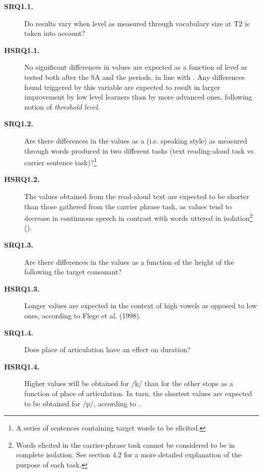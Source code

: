 \documentclass[output=paper]{langsci/langscibook}
\begin{document}
\begin{description}
 \item[\textbf{SRQ1.1.}] Do results vary when  level as measured through vocabulary size at T2 is taken into account? 

\item[\textbf{HSRQ1.1.}] No significant differences in  values are expected as a function of  level as tested both after the SA and the  periods, in line with \citet{AlvesZimmer2015}. Any differences found triggered by this variable are expected to result in larger improvement by low level learners than by more advanced ones, following  notion of \textit{threshold} \textit{level}.

\item[\textbf{SRQ1.2.}] Are there differences in the  values as a  (i.e. speaking style) as measured through words produced in two different tasks (text reading-aloud task vs. carrier sentence task)?\footnote{\textsuperscript{} A series of sentences containing target words to be elicited.}

\item[\textbf{HSRQ1.2.}] The  values obtained from the read-aloud text are expected to be shorter than those gathered from the carrier phrase task, as  values tend to decrease in continuous speech in contrast with words uttered in isolation\footnote{Words elicited in the carrier-phrase task cannot be considered to be in complete isolation. See section 4.2 for a more detailed explanation of the purpose of each task.} (\citealt{Labov1972,Mora2008,Bach2012}).

\item[\textbf{SRQ1.3.}] Are there differences in the  values as a function of the height of the  following the target   consonant?

\item[\textbf{HSRQ1.3.}] Longer  values are expected in the context of high vowels as opposed to low ones, according to Flege et al. (1998).

\item[\textbf{SRQ1.4.}] Does place of articulation have an effect on  duration?

\item[\textbf{HSRQ1.4.}] Higher  values will be obtained for /k/ than for the other stops as a function of place of articulation. In turn, the shortest  values are expected to be obtained for /p/, according to \citet{YavaşWildermuth2006}.

\end{description}
\end{document}
